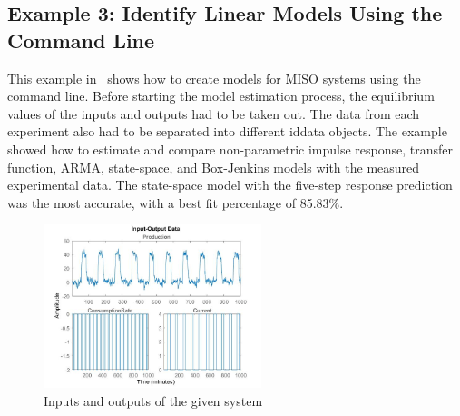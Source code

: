 \documentclass[letterpaper,12pt]{article}   %
\begin{document}
\subsection{Example 3: Identify Linear Models Using the Command Line}
\label{sec:sysID-Example3}
This example in~\cite{example3} shows how to create models for MISO systems
using the command line. Before starting the model estimation process, the
equilibrium values of the inputs and outputs had to be taken out. The data from
each experiment also had to be separated into different iddata objects. The
example showed how to estimate and compare non-parametric impulse response,
transfer function, ARMA, state-space, and Box-Jenkins models with the measured
experimental data. The state-space model with the five-step response prediction
was the most accurate, with a best fit percentage of 85.83\%.
\begin{figure}[h]
    \centering
    \captionsetup{justification=centering, margin=3cm}
    \includegraphics[width=2.5in]{figs/img/commandLineIO}
    \caption{Inputs and outputs of the given system}
    \label{fig:exIO}
\end{figure}
\end{document}
